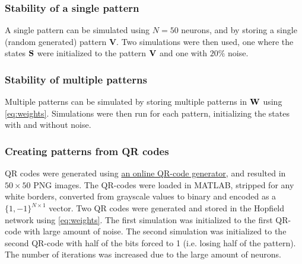 \subsubsection*{Stability of a single pattern}
A single pattern can be simulated using $N=50$ neurons, and by storing a single (random generated) pattern $\mathbf{V}$. Two simulations were then used, one where the states $\bf S$ were initialized to the pattern $\bf V$ and one with $20\%$ noise.
\subsubsection*{Stability of multiple patterns}
Multiple patterns can be simulated by storing multiple patterns in $\bf W$ using \cref{eq:weights}. Simulations were then run for each pattern, initializing the states with and without noise.

\subsubsection*{Creating patterns from QR codes}
QR codes were generated using \href{https://miniwebtool.com/qr-code-generator/}{an online QR-code generator}, and resulted in $50 \times 50$ PNG images. The QR-codes were loaded in MATLAB, stripped for any white borders, converted from grayscale values to binary and encoded as a $\{1, -1\}^{N \times 1}$ vector. Two QR codes were generated and stored in the Hopfield network using \cref{eq:weights}. The first simulation was initialized to the first QR-code with large amount of noise. The second simulation was initialized to the second QR-code with half of the bits forced to 1 (i.e. losing half of the pattern). The number of iterations was increased due to the large amount of neurons.





